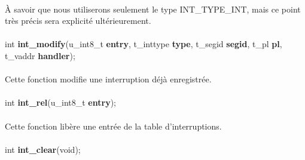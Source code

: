 \documentclass[10pt,a4wide]{article}
\begin{document}
\paragraph{}

\`A savoir que nous utiliserons seulement le type INT\_TYPE\_INT, mais
ce point tr\`es pr\'ecis sera explicit\'e ult\'erieurement.

\paragraph{}

\hspace{1.5cm}int \textbf{int\_modify}(u\_int8\_t \textbf{entry},
                                       t\_inttype \textbf{type},
                                       t\_segid \textbf{segid},
                                       t\_pl \textbf{pl}, \\
\bigskip
\hspace{4.3cm}                         t\_vaddr \textbf{handler});

\paragraph{}

Cette fonction modifie une interruption d\'ej\`a enregistr\'ee.

\paragraph{}

\hspace{1.5cm}int \textbf{int\_rel}(u\_int8\_t \textbf{entry});

\paragraph{}

Cette fonction lib\`ere une entr\'ee de la table d'interruptions.

\paragraph{}

\hspace{1.5cm}int \textbf{int\_clear}(void);

\paragraph{}
\end{document}
